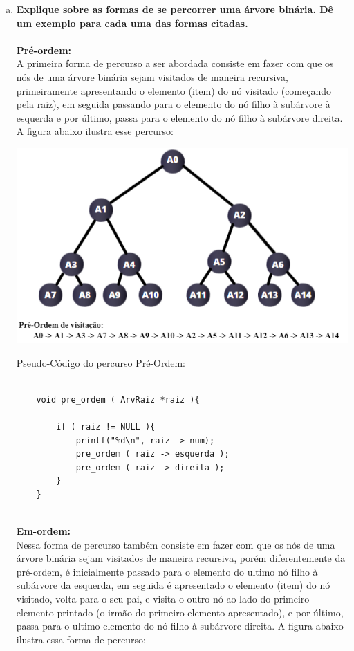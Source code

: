 \documentclass[11pt]{article} %
\begin{document}
\begin{enumerate}[a)]
	\newpage
	
		    \item {\bf Explique sobre as formas de se percorrer uma árvore binária. Dê um exemplo para cada uma das formas citadas.}\\ \\
		{\bf Pré-ordem:} \\
	\hspace*{1cm} A primeira forma de percurso a ser abordada consiste em fazer com que os nós de uma árvore binária sejam visitados de maneira recursiva, primeiramente apresentando o elemento (item) do nó visitado (começando pela raiz), em seguida passando para o elemento do nó filho à subárvore à esquerda e por último, passa para o elemento do nó filho à subárvore direita. A figura abaixo ilustra esse percurso:

	
		\begin{center}
			\includegraphics{q1bPreOrdem.png}
		\end{center}

	Pseudo-Código do percurso Pré-Ordem:
	\begin{lstlisting}

	void pre_ordem ( ArvRaiz *raiz ){
	
		if ( raiz != NULL ){
			printf("%d\n", raiz -> num);
			pre_ordem ( raiz -> esquerda );
			pre_ordem ( raiz -> direita );
		}
	}
	
	\end{lstlisting}

\newpage
	
		{\bf Em-ordem:} \\
	\hspace*{1cm}Nessa forma de percurso também consiste em fazer com que os nós de uma árvore binária sejam visitados de maneira recursiva, porém diferentemente da pré-ordem, é inicialmente passado para o elemento do ultimo nó filho à subárvore da esquerda, em seguida é apresentado o elemento (item) do nó visitado, volta para o seu pai, e visita o outro nó ao lado do primeiro elemento printado (o irmão do primeiro elemento apresentado), e por último, passa para o ultimo elemento do nó filho à subárvore direita. A figura abaixo ilustra essa forma de percurso:


\end{enumerate}
\end{document}
